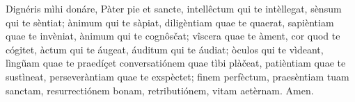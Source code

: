 Dignéris mìhi donáre, Pàter pie et sancte, intellêctum qui te intèllegat, sènsum qui te sèntiat; ànimum qui te sàpiat, diligèntiam quae te quaerat, sapièntiam quae te invèniat, ànimum qui te cognôsčat; vîscera quae te àment, cor quod te cógitet, àctum qui te áugeat, áuditum qui te áudiat; òculos qui te vìdeant, lìngũam quae te praedíçet conversatiónem quae tìbi plàčeat, patièntiam quae te sustìneat, perseveràntiam quae te exspèctet; finem perfèctum, praesèntiam tuam sanctam, resurrectiónem bonam, retributiónem, vitam aetèrnam. Amen. 

